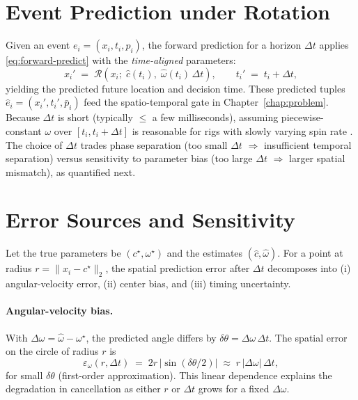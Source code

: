\section{Event Prediction under Rotation}
Given an event $e_i=(x_i,t_i,p_i)$, the forward prediction for a horizon $\Delta t$ applies \eqref{eq:forward-predict} with the \emph{time-aligned} parameters:
\begin{equation}
x_i' \;=\; \mathcal{R}\!\left(x_i;\;\hat c(t_i),\;\hat\omega(t_i)\,\Delta t\right), 
\qquad t_i' \;=\; t_i + \Delta t,
\label{eq:per-event-predict}
\end{equation}
yielding the predicted future location and decision time. These predicted tuples $\hat e_i=(x_i',t_i',\bar p_i)$ feed the spatio-temporal gate in Chapter~\ref{chap:problem}. Because $\Delta t$ is short (typically $\leq$ a few milliseconds), assuming piecewise-constant $\omega$ over $[t_i,t_i+\Delta t]$ is reasonable for rigs with slowly varying spin rate \cite{Gallego2017Angular,Scheerlinck2021Thesis}. The choice of $\Delta t$ trades phase separation (too small $\Delta t$ $\Rightarrow$ insufficient temporal separation) versus sensitivity to parameter bias (too large $\Delta t$ $\Rightarrow$ larger spatial mismatch), as quantified next.

\section{Error Sources and Sensitivity}
Let the true parameters be $(c^\star,\omega^\star)$ and the estimates $(\hat c,\hat\omega)$. For a point at radius $r=\|x_i-c^\star\|_2$, the spatial prediction error after $\Delta t$ decomposes into (i) angular-velocity error, (ii) center bias, and (iii) timing uncertainty.

\paragraph{Angular-velocity bias.}
With $\Delta\omega = \hat\omega-\omega^\star$, the predicted angle differs by $\delta\theta = \Delta\omega\,\Delta t$. The spatial error on the circle of radius $r$ is
\begin{equation}
\varepsilon_{\omega}(r,\Delta t) 
\;=\; 2r\,\big|\sin(\delta\theta/2)\big| 
\;\approx\; r\,|\Delta\omega|\,\Delta t,
\label{eq:err-omega}
\end{equation}
for small $\delta\theta$ (first-order approximation). This linear dependence explains the degradation in cancellation as either $r$ or $\Delta t$ grows for a fixed $\Delta\omega$.

